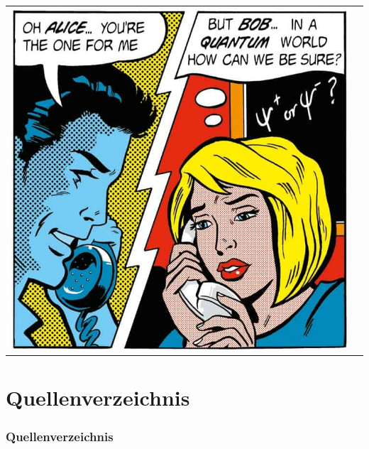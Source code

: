 \documentclass[11pt]{beamer}
\begin{document}
	\begin{frame}
		\maketitle
	\end{frame}
	
	\begin{frame}
		\begin{tabular}{cc}
			\includegraphics[scale=0.25]{figures/Communication-without-particles-pic1} &  \\
		\end{tabular}
	\end{frame}
	
	
	
	
	
	
	\section{Quellenverzeichnis}
	\begin{frame}[allowframebreaks]
		\frametitle{Quellenverzeichnis}
		
		
	\end{frame}
	
\end{document}
